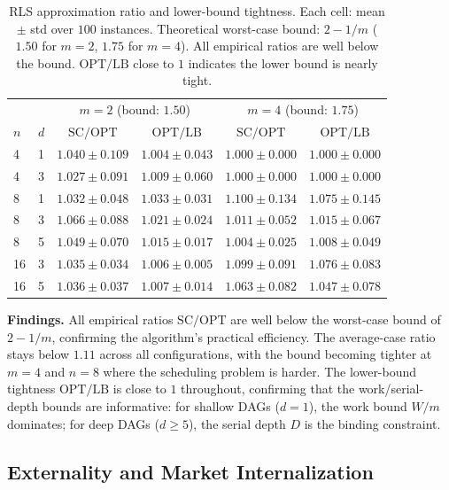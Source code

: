 \begin{table}
\centering
\caption{RLS approximation ratio and lower-bound tightness. Each cell: mean $\pm$ std over $100$ instances. Theoretical worst-case bound: $2-1/m$ ($1.50$ for $m=2$, $1.75$ for $m=4$). All empirical ratios are well below the bound. $\mathrm{OPT}/\mathrm{LB}$ close to $1$ indicates the lower bound is nearly tight.}
\label{tab:e1}
\renewcommand{\arraystretch}{1.2}
\begin{tabular}{ll|cc|cc}
\toprule
& & \multicolumn{2}{c|}{$m=2$ (bound: $1.50$)} & \multicolumn{2}{c}{$m=4$ (bound: $1.75$)} \\
$n$ & $d$ & $\mathrm{SC}/\mathrm{OPT}$ & $\mathrm{OPT}/\mathrm{LB}$ & $\mathrm{SC}/\mathrm{OPT}$ & $\mathrm{OPT}/\mathrm{LB}$ \\
\midrule
4 & 1 & $1.040 \pm 0.109$ & $1.004 \pm 0.043$ & $1.000 \pm 0.000$ & $1.000 \pm 0.000$ \\
4 & 3 & $1.027 \pm 0.091$ & $1.009 \pm 0.060$ & $1.000 \pm 0.000$ & $1.000 \pm 0.000$ \\
8 & 1 & $1.032 \pm 0.048$ & $1.033 \pm 0.031$ & $1.100 \pm 0.134$ & $1.075 \pm 0.145$ \\
8 & 3 & $1.066 \pm 0.088$ & $1.021 \pm 0.024$ & $1.011 \pm 0.052$ & $1.015 \pm 0.067$ \\
8 & 5 & $1.049 \pm 0.070$ & $1.015 \pm 0.017$ & $1.004 \pm 0.025$ & $1.008 \pm 0.049$ \\
16 & 3 & $1.035 \pm 0.034$ & $1.006 \pm 0.005$ & $1.099 \pm 0.091$ & $1.076 \pm 0.083$ \\
16 & 5 & $1.036 \pm 0.037$ & $1.007 \pm 0.014$ & $1.063 \pm 0.082$ & $1.047 \pm 0.078$ \\
\bottomrule
\end{tabular}
\end{table}

\textbf{Findings.} All empirical ratios $\mathrm{SC}/\mathrm{OPT}$ are well below the worst-case bound of $2-1/m$, confirming the algorithm's practical efficiency. The average-case ratio stays below $1.11$ across all configurations, with the bound becoming tighter at $m=4$ and $n=8$ where the scheduling problem is harder. The lower-bound tightness $\mathrm{OPT}/\mathrm{LB}$ is close to $1$ throughout, confirming that the work/serial-depth bounds are informative: for shallow DAGs ($d=1$), the work bound $W/m$ dominates; for deep DAGs ($d\ge 5$), the serial depth $D$ is the binding constraint.


\subsection{Externality and Market Internalization}\label{sec:exp-externality-market}

